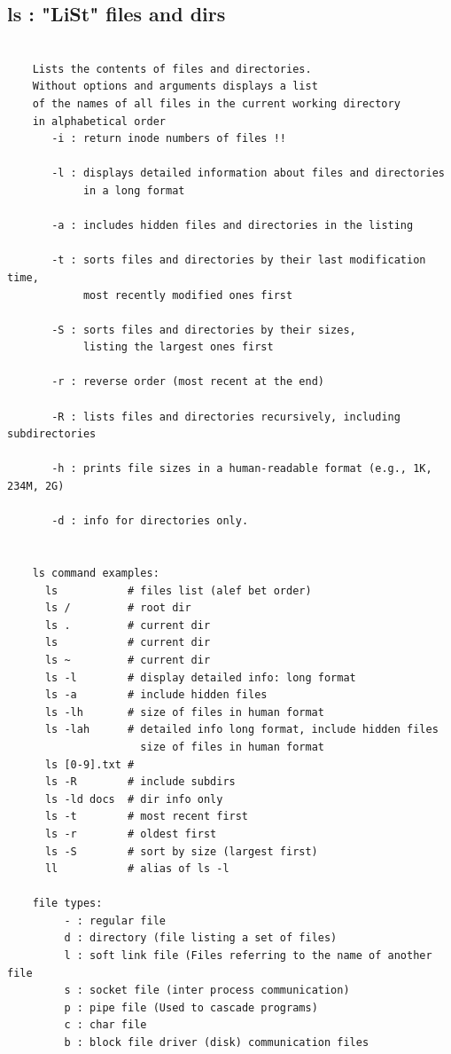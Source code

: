 \documentclass[a4paper,12pt]{article}
\begin{document}
\subsection{ls       : "LiSt" files and dirs}
\begin{verbatim}
    
    Lists the contents of files and directories. 
    Without options and arguments displays a list 
    of the names of all files in the current working directory
    in alphabetical order
       -i : return inode numbers of files !!
       
       -l : displays detailed information about files and directories
            in a long format

       -a : includes hidden files and directories in the listing

       -t : sorts files and directories by their last modification time,
            most recently modified ones first

       -S : sorts files and directories by their sizes,
            listing the largest ones first

       -r : reverse order (most recent at the end)

       -R : lists files and directories recursively, including subdirectories

       -h : prints file sizes in a human-readable format (e.g., 1K, 234M, 2G) 

       -d : info for directories only.
   

    ls command examples:
      ls           # files list (alef bet order)
      ls /         # root dir
      ls .         # current dir
      ls           # current dir
      ls ~         # current dir
      ls -l        # display detailed info: long format
      ls -a        # include hidden files
      ls -lh       # size of files in human format
      ls -lah      # detailed info long format, include hidden files
                     size of files in human format
      ls [0-9].txt # 
      ls -R        # include subdirs
      ls -ld docs  # dir info only
      ls -t        # most recent first
      ls -r        # oldest first
      ls -S        # sort by size (largest first)
      ll           # alias of ls -l

    file types:
         - : regular file
         d : directory (file listing a set of files)
         l : soft link file (Files referring to the name of another file
         s : socket file (inter process communication)
         p : pipe file (Used to cascade programs)
         c : char file
         b : block file driver (disk) communication files
         

\end{verbatim}
\end{document}
